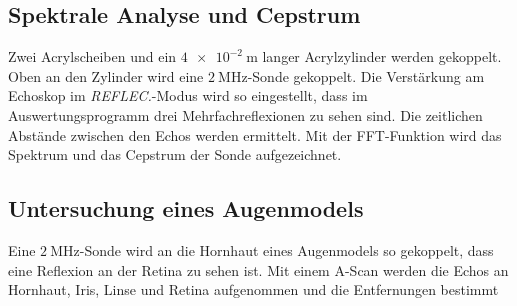 \subsection{Spektrale Analyse und Cepstrum}
Zwei Acrylscheiben und ein $\SI{4e-2}{\metre}$ langer Acrylzylinder werden gekoppelt. Oben an den Zylinder wird eine $\SI{2}{\mega\hertz}$-Sonde gekoppelt.
Die Verstärkung am Echoskop im \textit{REFLEC.}-Modus wird so eingestellt, dass im Auswertungsprogramm drei Mehrfachreflexionen zu sehen sind. Die zeitlichen Abstände zwischen den Echos werden ermittelt. Mit der FFT-Funktion wird das Spektrum und das Cepstrum der Sonde aufgezeichnet.

\subsection{Untersuchung eines Augenmodels}
Eine $\SI{2}{\mega\hertz}$-Sonde wird an die Hornhaut eines Augenmodels so gekoppelt, dass eine Reflexion an der Retina zu sehen ist. Mit einem A-Scan werden die Echos an Hornhaut, Iris, Linse und Retina aufgenommen und die Entfernungen bestimmt